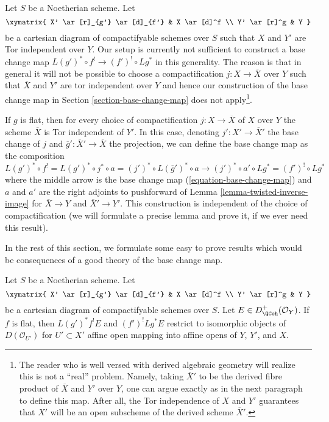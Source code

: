 \noindent
Let $S$ be a Noetherian scheme. Let
$$
\xymatrix{
X' \ar[r]_{g'} \ar[d]_{f'} & X \ar[d]^f \\
Y' \ar[r]^g & Y
}
$$
be a cartesian diagram of compactifyable schemes over $S$ such that
$X$ and $Y'$ are Tor independent over $Y$. Our setup is currently
not sufficient to construct a base change map
$L(g')^* \circ f^! \to (f')^! \circ Lg^*$ in this generality.
The reason is that in general it will not be possible to choose
a compactification $j : X \to \overline{X}$ over $Y$ such that
$\overline{X}$ and $Y'$ are tor independent over $Y$ and hence
our construction of the base change map in
Section \ref{section-base-change-map} does not apply\footnote{
The reader who is well versed with derived algebraic geometry
will realize this is not a ``real'' problem. Namely, taking
$\overline{X}'$ to be the derived fibre product of
$\overline{X}$ and $Y'$ over $Y$, one can argue exactly as in
the next paragraph to define this map. After all, the Tor independence
of $X$ and $Y'$ guarantees that $X'$ will be an open subscheme
of the derived scheme $\overline{X}'$.}.

\medskip\noindent
If $g$ is flat, then for every choice of
compactification $j : X \to \overline{X}$ of $X$ over $Y$
the scheme $\overline{X}$ is Tor independent of $Y'$.
In this case, denoting $j' : X' \to \overline{X}'$ the
base change of $j$ and $\overline{g}' : \overline{X}' \to \overline{X}$
the projection, we can define the base change map
as the composition
$$
L(g')^* \circ f^! = L(g')^* \circ j^* \circ a =
(j')^* \circ L(\overline{g}')^* \circ a \longrightarrow
(j')^* \circ a' \circ Lg^* = (f')^! \circ Lg^*
$$
where the middle arrow is the base change map
(\ref{equation-base-change-map})
and $a$ and $a'$ are the right adjoints to pushforward
of Lemma \ref{lemma-twisted-inverse-image}
for $\overline{X} \to Y$ and $\overline{X}' \to Y'$.
This construction is independent of the choice of
compactification (we will formulate a precise lemma
and prove it, if we ever need this result).

\medskip\noindent
In the rest of this section, we formulate some easy to prove
results which would be consequences of a good theory of the
base change map.

\begin{lemma}
\label{lemma-base-change-locally}
Let $S$ be a Noetherian scheme. Let
$$
\xymatrix{
X' \ar[r]_{g'} \ar[d]_{f'} & X \ar[d]^f \\
Y' \ar[r]^g & Y
}
$$
be a cartesian diagram of compactifyable schemes over $S$.
Let $E \in D^+_\QCoh(\mathcal{O}_Y)$.
If $f$ is flat, then $L(g')^*f^!E$ and $(f')^!Lg^*E$
restrict to isomorphic objects of $D(\mathcal{O}_{U'})$
for $U' \subset X'$ affine open mapping into affine opens of $Y$, $Y'$, and $X$.
\end{lemma}


